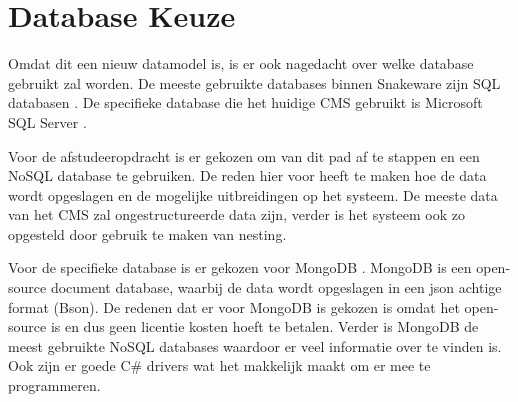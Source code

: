\section{Database Keuze}
Omdat dit een nieuw datamodel is, is er ook nagedacht over welke database gebruikt zal worden.
De meeste gebruikte databases binnen Snakeware zijn SQL databasen \parencite{SQL}. 
De specifieke database die het huidige CMS gebruikt is Microsoft SQL Server \parencite{MSQLServer}.

\whitespace
Voor de afstudeeropdracht is er gekozen om van dit pad af te stappen en een NoSQL \parencite{NoSQL} database te gebruiken.
De reden hier voor heeft te maken hoe de data wordt opgeslagen en de mogelijke uitbreidingen op het systeem.
De meeste data van het CMS zal ongestructureerde data zijn, verder is het systeem ook zo opgesteld door gebruik te maken van nesting.

\whitespace
Voor de specifieke database is er gekozen voor MongoDB \parencite{MongoDB}.
MongoDB is een open-source document database, waarbij de data wordt opgeslagen in een json achtige format (Bson).
De redenen dat er voor MongoDB is gekozen is omdat het open-source is en dus geen licentie kosten hoeft te betalen.
Verder is MongoDB de meest gebruikte NoSQL databases waardoor er veel informatie over te vinden is.
Ook zijn er goede C\# drivers wat het makkelijk maakt om er mee te programmeren.

